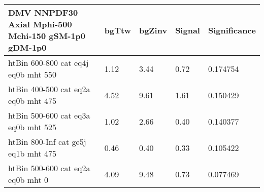  \begin{tabular}{|l|l|l|l|l|}
  \small
\label{mostSensitiveBins_DMV_NNPDF30_Axial_Mphi-500_Mchi-150_gSM-1p0_gDM-1p0_25ns}
	\textbf{DMV NNPDF30 Axial Mphi-500 Mchi-150 gSM-1p0 gDM-1p0}	 & 	bgTtw	 & 	bgZinv	 & 	Signal &	 Significance \\ 
	\hline
	htBin 600-800 cat eq4j eq0b mht 550 & 	1.12	 & 	3.44	 & 	0.72 	&0.174754 \\ 
	htBin 400-500 cat eq2a eq0b mht 475 & 	4.52	 & 	9.61	 & 	1.61 	&0.150429 \\ 
	htBin 500-600 cat eq3a eq0b mht 525 & 	1.02	 & 	2.66	 & 	0.40 	&0.140377 \\ 
	htBin 800-Inf cat ge5j eq1b mht 475 & 	0.46	 & 	0.40	 & 	0.33 	&0.105422 \\ 
	htBin 500-600 cat eq2a eq0b mht 0 & 	4.09	 & 	9.48	 & 	0.73 	&0.077469 \\ 
\end{tabular}
